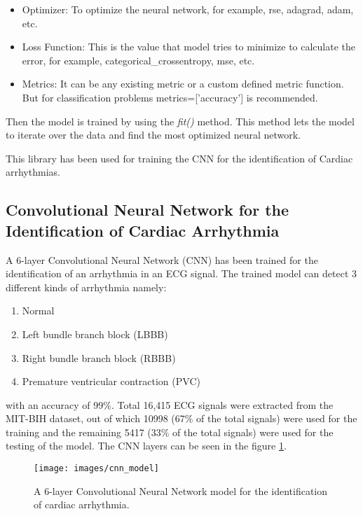 \begin{itemize}
	\item Optimizer: To optimize the neural network, for example, rse, adagrad, adam, etc.
	\item Loss Function: This is the value that model tries to minimize to calculate the error, for example, categorical\_crossentropy, mse, etc.
	\item Metrics: It can be any existing metric or a custom defined metric function. But for classification problems metrics=['accuracy'] is recommended.
\end{itemize}

Then the model is trained by using the \textit{fit()} method. This method lets the model to iterate over the data and find the most optimized neural network.

This library has been used for training the CNN for the identification of Cardiac arrhythmias.

\subsection{Convolutional Neural Network for the Identification of Cardiac Arrhythmia}
A 6-layer Convolutional Neural Network (CNN) has been trained for the identification of an arrhythmia in an ECG signal. The trained model can detect 3 different kinds of arrhythmia namely:

\begin{enumerate}
	\item Normal
	\item Left bundle branch block (LBBB)
	\item Right bundle branch block (RBBB)
	\item Premature ventricular contraction (PVC)
\end{enumerate}

 with an accuracy of 99\%. Total 16,415 ECG signals were extracted from the MIT-BIH dataset, out of which 10998 (67\% of the total signals) were used for the training and the remaining 5417 (33\% of the total signals) were used for the testing of the model. The CNN layers can be seen in the figure \ref{fig:cnn_model}.



\begin{figure}[htpb]
	\centering
	\texttt{[image: images/cnn\_model]}
	\caption{
		A 6-layer Convolutional Neural Network model for the identification of cardiac arrhythmia.
	}
	\label{fig:cnn_model}
\end{figure}


